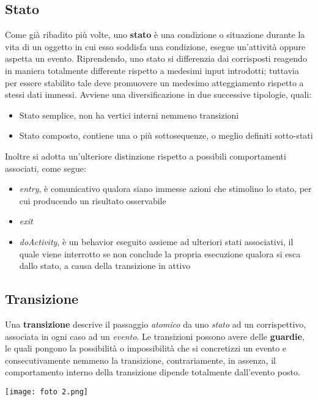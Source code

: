 \documentclass{article}
\begin{document}
\subsection*{Stato}
\large
Come già ribadito più volte, uno \textbf{stato} è una condizione o situazione durante la vita di un oggetto in cui esso soddisfa una condizione, esegue un'attività oppure aspetta un evento. Riprendendo, uno stato si differenzia dai corrisposti reagendo in maniera totalmente differente rispetto a medesimi input introdotti; tuttavia per essere stabilito tale deve promuovere un medesimo atteggiamento rispetto a stessi dati immessi. Avviene una diversificazione in due successive tipologie, quali:
\begin{itemize}[label={-}]
    \itemsep0em
    \item Stato semplice, non ha vertici interni nemmeno transizioni
    \item Stato composto, contiene una o più sottosequenze, o meglio definiti sotto-stati
\end{itemize}
Inoltre si adotta un'ulteriore distinzione rispetto a possibili comportamenti associati, come segue:
\begin{itemize}[label={-}]
    \itemsep0em
    \item \textit{entry}, è comunicativo qualora siano immesse azioni che stimolino lo stato, per cui producendo un risultato osservabile
    \item \textit{exit} 
    \item \textit{doActivity}, è un behavior eseguito assieme ad ulteriori stati associativi, il quale viene interrotto se non conclude la propria esecuzione qualora si esca dallo stato, a causa della transizione in attivo
\end{itemize}

\subsection*{Transizione}
\large
Una \textbf{transizione} descrive il passaggio \textit{atomico} da uno \textit{stato} ad un corrispettivo, associata in ogni caso ad un \textit{evento}. Le transizioni possono avere delle \textbf{guardie}, le quali pongono la possibilità o impossibilità che si concretizzi un evento e consecutivamente nemmeno la transizione, contrariamente, in assenza, il comportamento interno della transizione dipende totalmente dall'evento posto.\vspace*{14pt}
\begin{center}
    \texttt{[image: foto 2.png]}
\end{center}

\pagebreak
\end{document}
